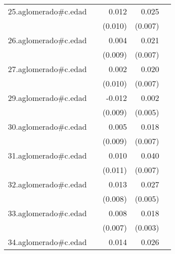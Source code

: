 {\begin{longtable}{l*{4}{D{.}{.}{-1}}}
\addlinespace
25.aglomerado#c.edad&                     &       0.012         &       0.025\sym{***}&                     \\
            &                     &     (0.010)         &     (0.007)         &                     \\
\addlinespace
26.aglomerado#c.edad&                     &       0.004         &       0.021\sym{**} &                     \\
            &                     &     (0.009)         &     (0.007)         &                     \\
\addlinespace
27.aglomerado#c.edad&                     &       0.002         &       0.020\sym{**} &                     \\
            &                     &     (0.010)         &     (0.007)         &                     \\
\addlinespace
29.aglomerado#c.edad&                     &      -0.012         &       0.002         &                     \\
            &                     &     (0.009)         &     (0.005)         &                     \\
\addlinespace
30.aglomerado#c.edad&                     &       0.005         &       0.018\sym{**} &                     \\
            &                     &     (0.009)         &     (0.007)         &                     \\
\addlinespace
31.aglomerado#c.edad&                     &       0.010         &       0.040\sym{***}&                     \\
            &                     &     (0.011)         &     (0.007)         &                     \\
\addlinespace
32.aglomerado#c.edad&                     &       0.013         &       0.027\sym{***}&                     \\
            &                     &     (0.008)         &     (0.005)         &                     \\
\addlinespace
33.aglomerado#c.edad&                     &       0.008         &       0.018\sym{***}&                     \\
            &                     &     (0.007)         &     (0.003)         &                     \\
\addlinespace
34.aglomerado#c.edad&                     &       0.014         &       0.026\sym{***}&                     \\

\end{longtable}}
